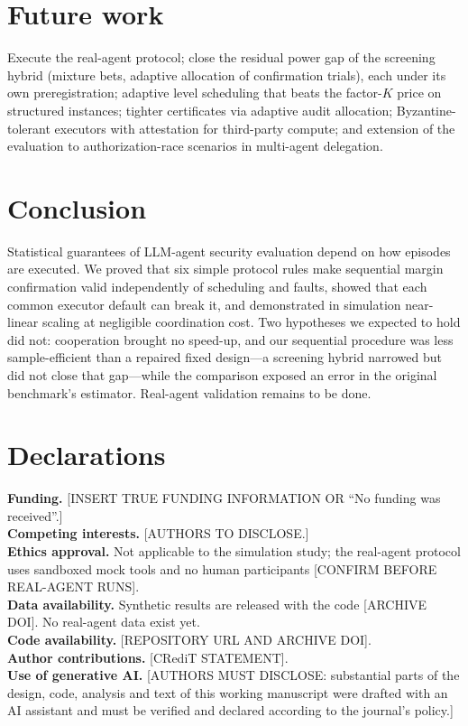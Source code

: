 \documentclass[11pt]{article}
\theoremstyle{definition}
\theoremstyle{remark}
\newcommand{\todo}[1]{\textcolor{red!70!black}{[#1]}}
\begin{document}
\section{Future work}\label{sec:future}
Execute the real-agent protocol; close the residual power gap of the screening hybrid (mixture bets, adaptive allocation of confirmation trials), each under its own preregistration; adaptive level scheduling that beats the factor-$K$ price on structured instances; tighter certificates via adaptive audit allocation; Byzantine-tolerant executors with attestation for third-party compute; and extension of the evaluation to authorization-race scenarios in multi-agent delegation.

\section{Conclusion}\label{sec:conclusion}
Statistical guarantees of LLM-agent security evaluation depend on how episodes are executed. We proved that six simple protocol rules make sequential margin confirmation valid independently of scheduling and faults, showed that each common executor default can break it, and demonstrated in simulation near-linear scaling at negligible coordination cost. Two hypotheses we expected to hold did not: cooperation brought no speed-up, and our sequential procedure was less sample-efficient than a repaired fixed design---a screening hybrid narrowed but did not close that gap---while the comparison exposed an error in the original benchmark's estimator. Real-agent validation remains to be done.

\section*{Declarations}
\noindent\textbf{Funding.} \todo{INSERT TRUE FUNDING INFORMATION OR ``No funding was received''.}\\
\textbf{Competing interests.} \todo{AUTHORS TO DISCLOSE.}\\
\textbf{Ethics approval.} Not applicable to the simulation study; the real-agent protocol uses sandboxed mock tools and no human participants \todo{CONFIRM BEFORE REAL-AGENT RUNS}.\\
\textbf{Data availability.} Synthetic results are released with the code \todo{ARCHIVE DOI}. No real-agent data exist yet.\\
\textbf{Code availability.} \todo{REPOSITORY URL AND ARCHIVE DOI}.\\
\textbf{Author contributions.} \todo{CRediT STATEMENT}.\\
\textbf{Use of generative AI.} \todo{AUTHORS MUST DISCLOSE: substantial parts of the design, code, analysis and text of this working manuscript were drafted with an AI assistant and must be verified and declared according to the journal's policy.}



\end{document}
